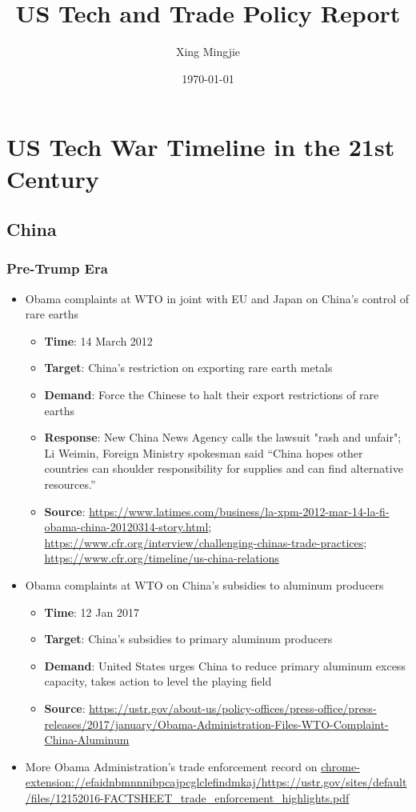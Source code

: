 \documentclass[12pt]{article} %
\title{US Tech and Trade Policy Report}
\author{Xing Mingjie}
\date{\today} %
\begin{document}
\maketitle

\tableofcontents

\newpage

\section{US Tech War Timeline in the 21st Century}
	\subsection{China}
		\subsubsection{Pre-Trump Era}
			\begin{itemize}
			\item	Obama complaints at WTO in joint with EU and Japan on China's control of rare earths
				\begin{itemize}
				\item	\textbf{Time}: 14 March 2012
				\item \textbf{Target}: China's restriction on exporting rare earth metals
				\item \textbf{Demand}: Force the Chinese to halt their export restrictions of rare earths
				\item \textbf{Response}: New China News Agency calls the lawsuit "rash and unfair"; Li Weimin, Foreign Ministry spokesman said  “China hopes other countries can shoulder responsibility for supplies and can find alternative resources.”
				\item \textbf{Source}: \url{https://www.latimes.com/business/la-xpm-2012-mar-14-la-fi-obama-china-20120314-story.html}; \url{https://www.cfr.org/interview/challenging-chinas-trade-practices}; \url{https://www.cfr.org/timeline/us-china-relations}
				\end{itemize}
			\item Obama complaints at WTO on China's subsidies to aluminum producers
				\begin{itemize}
				\item	\textbf{Time}: 12 Jan 2017
				\item \textbf{Target}: China's subsidies to primary aluminum producers
				\item \textbf{Demand}: United States urges China to reduce primary aluminum excess capacity, takes action to level the playing field
				\item \textbf{Source}: \url{https://ustr.gov/about-us/policy-offices/press-office/press-releases/2017/january/Obama-Administration-Files-WTO-Complaint-China-Aluminum}
				\end{itemize}
			\item More Obama Administration's trade enforcement record on \url{chrome-extension://efaidnbmnnnibpcajpcglclefindmkaj/https://ustr.gov/sites/default/files/12152016-FACTSHEET_trade_enforcement_highlights.pdf}
			\end{itemize}
		
\end{document}
